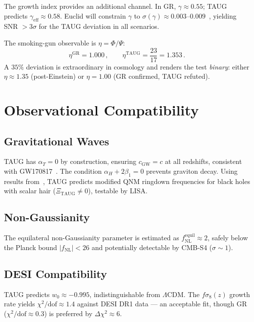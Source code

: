 \documentclass[twocolumn,showpacs,preprintnumbers,amsmath,amssymb,prd]{revtex4-2}
\begin{document}
The growth index provides an additional channel. In GR, $\gamma \approx 0.55$; TAUG predicts $\gamma_\text{eff} \approx 0.58$. Euclid will constrain $\gamma$ to $\sigma(\gamma) \approx 0.003$--$0.009$~\cite{EuclidMG2025}, yielding SNR $> 3\sigma$ for the TAUG deviation in all scenarios.

The smoking-gun observable is $\eta = \Phi/\Psi$:
\begin{equation}
\eta^\text{GR} = 1.000\,,\qquad \eta^\text{TAUG} = \frac{23}{17} = 1.353\,.
\end{equation}
A $35\%$ deviation is extraordinary in cosmology and renders the test \emph{binary}: either $\eta \approx 1.35$ (post-Einstein) or $\eta = 1.00$ (GR confirmed, TAUG refuted).

\section{Observational Compatibility}
\label{sec:obs}

\subsection{Gravitational Waves}

TAUG has $\alpha_T = 0$ by construction, ensuring $c_\text{GW} = c$ at all redshifts, consistent with GW170817~\cite{Abbott2017}. The condition $\alpha_H + 2\beta_1 = 0$ prevents graviton decay. Using results from~\cite{Charmousis2019}, TAUG predicts modified QNM ringdown frequencies for black holes with scalar hair ($\Xi_\text{TAUG} \neq 0$), testable by LISA.

\subsection{Non-Gaussianity}

The equilateral non-Gaussianity parameter is estimated as $f_\text{NL}^\text{equil} \approx 2$, safely below the Planck bound $|f_\text{NL}| < 26$ and potentially detectable by CMB-S4 ($\sigma \sim 1$).

\subsection{DESI Compatibility}

TAUG predicts $w_0 \approx -0.995$, indistinguishable from $\Lambda$CDM. The $f\sigma_8(z)$ growth rate yields $\chi^2/\text{dof} \approx 1.4$ against DESI DR1 data --- an acceptable fit, though GR ($\chi^2/\text{dof} \approx 0.3$) is preferred by $\Delta\chi^2 \approx 6$.
\end{document}
